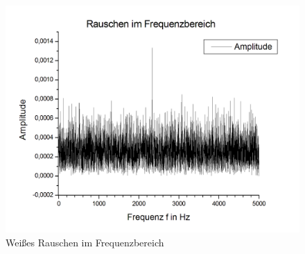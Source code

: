 \documentclass{scrartcl}						%
\begin{document}
			\begin{figure}[h!t!bp]
				\centering
				\includegraphics[scale=0.35]{A1c-Graph}
				\caption{Weißes Rauschen im Frequenzbereich}
			\end{figure}
			
			
\end{document}
